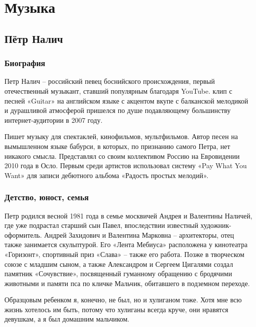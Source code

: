 \chapter{Музыка}


\section{Пётр Налич}
\subsection{Биография}
Петр Налич – российский певец боснийского происхождения, первый отечественный музыкант, ставший популярным благодаря YouTube.  клип с песней «Guitar» на английском языке с акцентом вкупе с балканской мелодикой и дурашливой атмосферой пришелся по душе подавляющему большинству интернет-аудитории в 2007 году.

Пишет музыку для спектаклей, кинофильмов, мультфильмов. Автор песен на вымышленном языке бабурси, в которых, по признанию самого Петра, нет никакого смысла. Представлял со своим коллективом Россию на Евровидении 2010 года в Осло. Первым среди артистов использовал систему «Pay What You Want» для записи дебютного альбома «Радость простых мелодий».

\subsection{Детство, юност, семья}
Петр родился весной 1981 года в семье москвичей Андрея и Валентины Наличей, где уже подрастал старший сын Павел, впоследствии известный художник-оформитель. Андрей Захидович и Валентина Марковна – архитекторы, отец также занимается скульптурой. Его «Лента Мебиуса» расположена у кинотеатра «Горизонт», спортивный приз «Слава» – также его работа. Позже в творческом союзе с младшим сыном, а также Александром и Сергеем Цигалями создал памятник «Сочувствие», посвященный гуманному обращению с бродячими животными и памяти пса по кличке Мальчик, обитавшего в подземном переходе.

\begin{fancyquotes}
    Образцовым ребенком я, конечно, не был, но и хулиганом тоже. Хотя мне всю жизнь хотелось им быть, потому что хулиганы всегда круче, они нравятся девушкам, а я был домашним мальчиком.
\end{fancyquotes}

